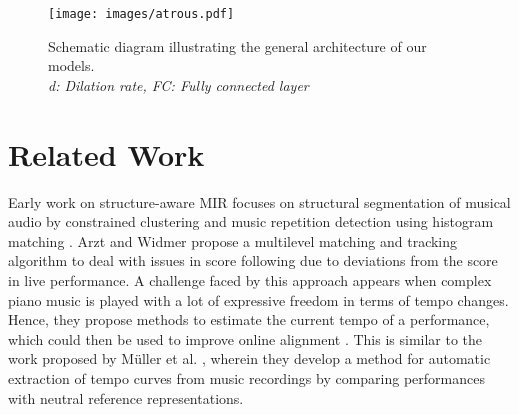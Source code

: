 \documentclass{article}
\begin{document}
\begin{figure*}[th]
  \vspace{-2.6cm}
  \centering
  \texttt{[image: images/atrous.pdf]}
  \vspace{-0.7cm}
  \caption{Schematic diagram illustrating the general architecture of our models.\\ \textit{d: Dilation rate, FC: Fully connected layer}}
  \vspace{-0.4cm}
  \label{fig:pipeline}
\end{figure*}
\vspace{-0.3cm}
\section{Related Work}\label{related}
\vspace{-0.2cm}
Early work on structure-aware MIR focuses on structural segmentation of musical audio by constrained clustering \cite{levy2008structural} and music repetition detection using histogram matching \cite{tian2009histogram}. %
Arzt and Widmer \cite{arzt2010towards} propose a multilevel matching and tracking algorithm to deal with issues in score following due to deviations from the score in live performance. 
A challenge faced by this approach appears when complex piano music is played with a lot of expressive freedom in terms of tempo changes. Hence, they propose methods to estimate the current tempo of a performance, which could then be used to improve online alignment  \cite{arzt2010simple}. This is similar to the work proposed by Müller et al. \cite{muller2009towards}, wherein they develop a method for automatic extraction of tempo curves from music recordings
by comparing performances with neutral reference representations.
\end{document}
